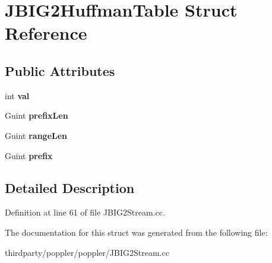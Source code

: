 \hypertarget{struct_j_b_i_g2_huffman_table}{}\section{J\+B\+I\+G2\+Huffman\+Table Struct Reference}
\label{struct_j_b_i_g2_huffman_table}
\subsection*{Public Attributes}
\begin{DoxyCompactItemize}
\item 
\mbox{\label{struct_j_b_i_g2_huffman_table_a6410c5a1b88c541c3bc689bc42c4b959}} 
int {\bfseries val}
\item 
\mbox{\label{struct_j_b_i_g2_huffman_table_ab87cea19ce6214549593f56f4836d992}} 
Guint {\bfseries prefix\+Len}
\item 
\mbox{\label{struct_j_b_i_g2_huffman_table_a4dbd840bcae91d6494e45545272c1480}} 
Guint {\bfseries range\+Len}
\item 
\mbox{\label{struct_j_b_i_g2_huffman_table_abfb561ed6997fa1f9ac8fe47ccf8361f}} 
Guint {\bfseries prefix}
\end{DoxyCompactItemize}


\subsection{Detailed Description}


Definition at line 61 of file J\+B\+I\+G2\+Stream.\+cc.



The documentation for this struct was generated from the following file\+:\begin{DoxyCompactItemize}
\item 
thirdparty/poppler/poppler/J\+B\+I\+G2\+Stream.\+cc\end{DoxyCompactItemize}
